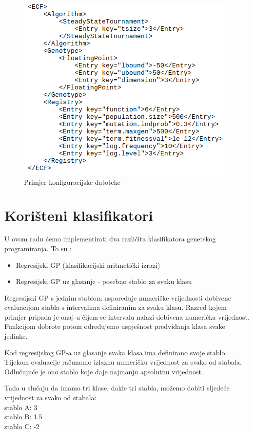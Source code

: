 \documentclass[times, utf8, zavrsni]{fer}
\begin{document}
\begin{figure}[htb]
\centering
\includegraphics[scale=0.6]{images/xml2}
\caption{Primjer konfiguracijske datoteke}
\end{figure}

\section{Korišteni klasifikatori}



U ovom radu ćemo implementirati dva različita klasifikatora genetskog programiranja. To su :

\begin{itemize}
\item Regresijski GP (klasifikacijski aritmetički izrazi)
\item Regresijski GP uz glasanje - posebno stablo za svaku klasu
\end{itemize}


Regresijski GP s jednim stablom uspoređuje numeričke vrijednosti dobivene evaluacijom stabla s intervalima definiranim za svaku klasu. Razred kojem primjer pripada je onaj u čijem se intervalu nalazi dobivena numerička vrijednost. Funkcijom dobrote potom određujemo uspješnost predviđanja klasa svake jedinke.

Kod regresijskog GP-a uz glasanje svaka klasa ima definirano svoje stablo.  Tijekom evaluacije računamo izlaznu numeričku vrijednost za svako od stabala. Odlučujuće je ono stablo koje daje najmanju apsolutnu vrijednost.
 

Tada u slučaju da imamo tri klase, dakle tri stabla, možemo dobiti sljedeće vrijednost za svako od stabala: \\
stablo A: 3 \\
stablo B: 1.5 \\
stablo C: -2 \\
\end{document}
